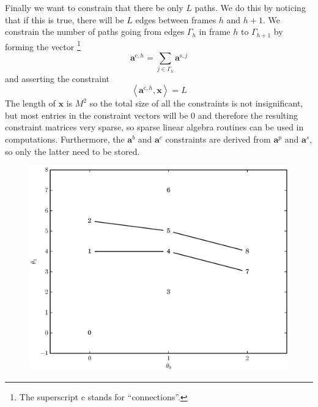 Finally we want to constrain that there be only $L$ paths. We do this by
noticing that if this is true, there will be $L$ edges between frames $h$ and
$h+1$. We constrain the number of paths going from edges
$\Gamma_{h}$ in frame $h$ to $\Gamma_{h+1}$ by forming the vector
\footnote{The superscript c stands for ``connections''.}
\[
    \boldsymbol{a}^{\text{c},h} = \sum_{j \in \Gamma_{h}}
    \boldsymbol{a}^{\text{s},j}
\]
and asserting the constraint
\[
    \left\langle \boldsymbol{a}^{\text{c},h} , \boldsymbol{x} \right\rangle = L
\]
The length of $\boldsymbol{x}$ is $M^{2}$ so the total size of all the
constraints is not insignificant, but most entries in the constraint vectors will
be 0 and therefore the resulting constraint matrices very sparse, so sparse
linear algebra routines can be used in computations. Furthermore, the
$\boldsymbol{a}^{b}$ and $\boldsymbol{a}^{c}$ constraints are derived from
$\boldsymbol{a}^{p}$ and $\boldsymbol{a}^{s}$, so only the latter need to be
stored.

\begin{figure}[!t]
    \centering
    \includegraphics[width=\figwidthscale\textwidth]{plots/small_graph_ex_lp_paths.eps}
    \CaptionWithTitle{%
    }{\label{plot:simple_graph_lp_paths}}
\end{figure}

